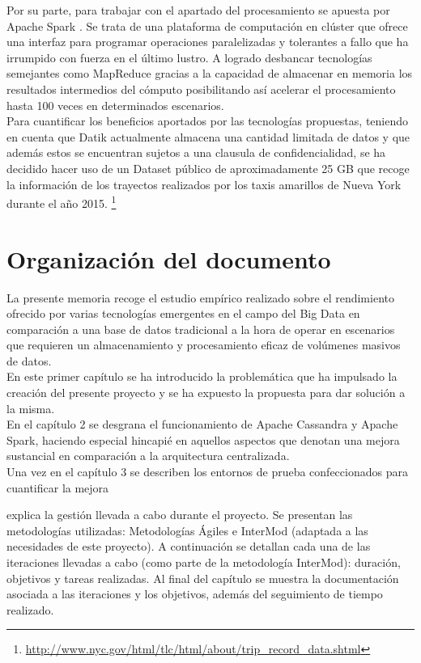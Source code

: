 Por su parte, para trabajar con el apartado del procesamiento se apuesta por Apache Spark \cite{zaharia2010spark}. Se trata de una plataforma de computación en clúster que ofrece una interfaz para programar operaciones paralelizadas y tolerantes a fallo que ha irrumpido con fuerza en el último lustro. A logrado desbancar tecnologías semejantes como MapReduce \cite{dean2008mapreduce} gracias a la capacidad de almacenar en memoria los resultados intermedios del cómputo posibilitando así acelerar el procesamiento hasta 100 veces \cite{xin2013shark} en determinados escenarios.\\

Para cuantificar los beneficios aportados por las tecnologías propuestas, teniendo en cuenta que Datik actualmente almacena una cantidad limitada de datos y que además estos se encuentran sujetos a una clausula de confidencialidad, se ha decidido hacer uso de un Dataset público de aproximadamente 25 GB que recoge la información de los trayectos realizados por los taxis amarillos de Nueva York durante el año 2015. \footnote{\url{http://www.nyc.gov/html/tlc/html/about/trip_record_data.shtml}}

\section{Organización del documento}

La presente memoria recoge el estudio empírico realizado sobre el rendimiento ofrecido por varias tecnologías emergentes en el campo del Big Data en comparación a una base de datos tradicional a la hora de operar en escenarios que requieren un almacenamiento y procesamiento eficaz de volúmenes masivos de datos.\\

En este primer capítulo se ha introducido la problemática que ha impulsado la creación del presente proyecto y se ha expuesto la propuesta para dar solución a la misma.\\

En el capítulo 2 se desgrana el funcionamiento de Apache Cassandra y Apache Spark, haciendo especial hincapié en aquellos aspectos que denotan una mejora sustancial en comparación a la arquitectura centralizada.\\

Una vez en el capítulo 3 se describen los entornos de prueba confeccionados para cuantificar la mejora 

explica la gestión llevada a cabo durante el proyecto. Se presentan las metodologías utilizadas: Metodologías Ágiles e InterMod (adaptada a las necesidades de este proyecto). A continuación se detallan cada una de las iteraciones llevadas a cabo (como parte de la metodología InterMod): duración, objetivos y tareas realizadas. Al final del capítulo se muestra la documentación asociada a las iteraciones y los objetivos, además del seguimiento de tiempo realizado.\\

